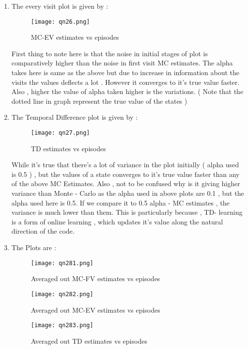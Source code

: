 \documentclass[a4 paper]{article}
\begin{document}
\begin{enumerate}
\item The every visit plot is given by  :

\begin{figure}[h!]
    \centering
    \texttt{[image: qn26.png]}
    \caption{ MC-EV estimates vs episodes}
\end{figure}

First thing to note here is that the noise in initial stages of plot is comparatively higher than the noise in first visit MC estimates. The alpha takes here is same as the above but due to increase in information about the visits the values deflects a lot . However it converges to it's true value faster. Also , higher the value of alpha taken higher is the variations. ( Note that the dotted line in graph represent the true value of the states )

\item The Temporal Difference plot is given by  :

\begin{figure}[h!]
    \centering
    \texttt{[image: qn27.png]}
    \caption{ TD estimates vs episodes}
\end{figure}

While it's true that there's a lot of variance in the plot initially ( alpha used is 0.5 ) , but the values of a state converges to it's true value faster than any of the above MC Estimates. Also , not to be confused why is it giving higher variance than Monte - Carlo as the alpha used in above plots are 0.1 , but the alpha used here is 0.5. If we compare it to 0.5 alpha - MC estimates , the variance is much lower than them. This is particularly because , TD- learning is a form of online learning , which updates it's value along the natural direction of the code. 


\item The Plots are  :

\begin{figure}[h!]
    \centering
    \texttt{[image: qn281.png]}
    \caption{ Averaged out MC-FV estimates vs episodes}
\end{figure}

\begin{figure}[h!]
    \centering
    \texttt{[image: qn282.png]}
    \caption{ Averaged out MC-EV estimates vs episodes}
\end{figure}

\begin{figure}[h!]
    \centering
    \texttt{[image: qn283.png]}
    \caption{ Averaged out TD estimates vs episodes}
\end{figure}


\end{enumerate}
\end{document}
